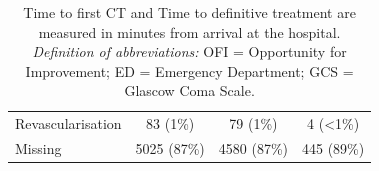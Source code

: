 \documentclass[12pt, a4paper]{article}
\begin{document}
\begin{appendices}
\begin{table}[t!]
{\begin{tabular}{lccc}
				\hspace{3mm}Revascularisation                 & 83 (1\%)          & 79 (1\%)          & 4 (\textless1\%) \\
				\hspace{3mm}Missing                           & 5025 (87\%)       & 4580 (87\%)       & 445 (89\%)       \\
				\bottomrule
			\end{tabular}
		}
		\caption*{\small Time to first CT and Time to definitive treatment are measured in minutes from arrival at the hospital.\\
			\textit{Definition of abbreviations:} OFI = Opportunity for Improvement; ED = Emergency Department; GCS = Glascow Coma Scale.}
	\end{table}

	\begin{table}[t!]
		\centering
		\renewcommand{\arraystretch}{0.9}
		\caption{\textbf{Selected patient demographic and clinical characteristics}. Subdivided by \acrshort{ofi} outcome for \acrshort{tvae} data.}
		\label{tab:tableonetvae}
\end{table}
\end{appendices}
\end{document}
